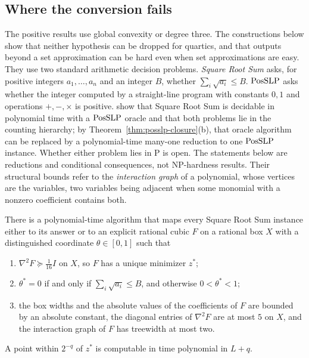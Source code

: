 \subsection{Where the conversion fails}\label{sec:points-limits}

The positive results use global convexity or degree three. The constructions
below show that neither hypothesis can be dropped for quartics, and that
outputs beyond a set approximation can be hard even when set approximations are
easy. They use two standard arithmetic decision problems. \emph{Square Root
Sum} asks, for positive integers $a_1,\ldots,a_n$ and an integer $B$, whether
$\sum_i\sqrt{a_i}\le B$.
\emph{$\mathrm{PosSLP}$} asks whether the integer computed by a straight-line program
with constants $0,1$ and operations $+,-,\times$ is positive.
\citet{AllenderEtAl2009} show that Square Root Sum is decidable in polynomial
time with a $\mathrm{PosSLP}$ oracle and that both problems lie in the counting
hierarchy; by Theorem~\ref{thm:posslp-closure}(b), that oracle algorithm can be
replaced by a polynomial-time many-one reduction to one $\mathrm{PosSLP}$ instance.
Whether either problem lies in $\mathrm P$ is open. The statements below are
reductions and conditional consequences, not NP-hardness results. Their
structural bounds refer to the \emph{interaction graph} of a polynomial,
whose vertices are the variables, two variables being adjacent when some
monomial with a nonzero coefficient contains both.

\begin{proposition}\label{prop:points-active}
There is a polynomial-time algorithm that maps every Square Root Sum
instance either to its answer or to an explicit rational cubic $F$ on a
rational box $X$ with a distinguished coordinate $\theta\in[0,1]$ such that
\begin{enumerate}[label=(\roman*)]
\item $\nabla^2F\succeq\frac1{16}I$ on $X$, so $F$ has a unique minimizer
$z^*$;
\item $\theta^*=0$ if and only if $\sum_i\sqrt{a_i}\le B$, and otherwise
$0<\theta^*<1$;
\item the box widths and the absolute values of the coefficients of $F$ are
bounded by an absolute constant, the diagonal entries of $\nabla^2F$ are at
most $5$ on $X$, and the interaction graph of $F$ has treewidth at most two.
\end{enumerate}
A point within $2^{-q}$ of $z^*$ is computable in time polynomial in $L+q$.
\end{proposition}


